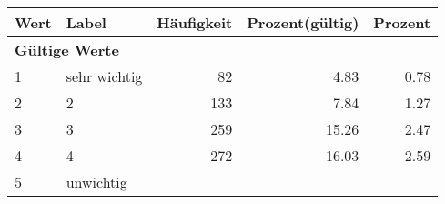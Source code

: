      \begin{longtable}{lXrrr}
     \toprule
     \textbf{Wert} & \textbf{Label} & \textbf{Häufigkeit} & \textbf{Prozent(gültig)} & \textbf{Prozent} \\
     \endhead
     \midrule
     \multicolumn{5}{l}{\textbf{Gültige Werte}}\\

     1 &
     \multicolumn{1}{X}{ sehr wichtig   } &


       \num{82} &
       \num[round-mode=places,round-precision=2]{4.83} &
         \num[round-mode=places,round-precision=2]{0.78} \\

     2 &
     \multicolumn{1}{X}{ 2   } &


       \num{133} &
       \num[round-mode=places,round-precision=2]{7.84} &
         \num[round-mode=places,round-precision=2]{1.27} \\

     3 &
     \multicolumn{1}{X}{ 3   } &


       \num{259} &
       \num[round-mode=places,round-precision=2]{15.26} &
         \num[round-mode=places,round-precision=2]{2.47} \\

     4 &
     \multicolumn{1}{X}{ 4   } &


       \num{272} &
       \num[round-mode=places,round-precision=2]{16.03} &
         \num[round-mode=places,round-precision=2]{2.59} \\

     5 &
     \multicolumn{1}{X}{ unwichtig   } &



\end{longtable}
